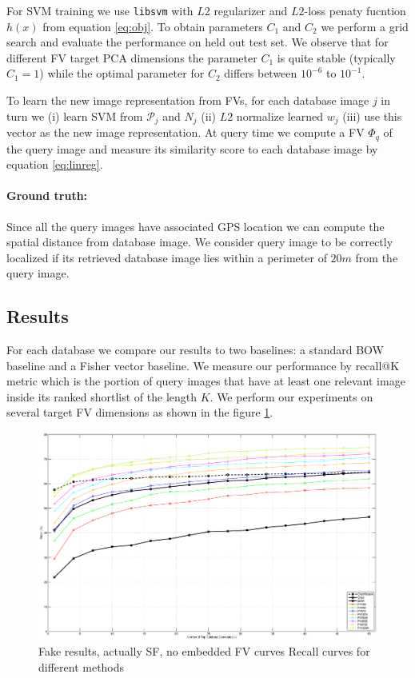 \documentclass[table]{article} %
\begin{document}
			For SVM training we use {\tt libsvm} \cite{libsvm} with $L2$ regularizer and $L2$-loss penaty fucntion $h(x)$ from equation \eqref{eq:obj}. To obtain parameters $C_1$ and $C_2$ we perform a grid search and evaluate the performance on held out test set. We observe that for different FV target PCA dimensions the parameter $C_1$ is quite stable (typically $C_1=1$) while the optimal parameter for $C_2$ differs between $10^{-6}$ to $10^{-1}$.

			To learn the new image representation from FVs, for each database image $j$ in turn we (i) learn SVM from $\mathcal P_j$ and $N_j$ (ii) $L2$ normalize learned $w_j$ (iii) use this vector as the new image representation. At query time we compute a FV $\Phi_q$ of the query image and measure its similarity score to each database image by equation \eqref{eq:linreg}.
		
		\vspace{-4mm}
		\paragraph{Ground truth:}
			Since all the query images have associated GPS location we can compute the spatial distance from database image. We consider query image to be correctly localized if its retrieved database image lies within a perimeter of $20m$ from the query image.
	
	\subsection{Results}
		For each database we compare our results to two baselines: a standard BOW baseline and a Fisher vector baseline. We measure our performance by recall@K metric which is the portion of query images that have at least one relevant image inside its ranked shortlist of the length $K$. We perform our experiments on several target FV dimensions as shown in the figure \ref{fig:recall}.

		\begin{figure}
		\centering
		\includegraphics[width=\linewidth]{evaluationWOWplot}	
		\caption{
			\textcolor{myRed}{Fake results, actually SF, no embedded FV curves}
			Recall curves for different methods
		}
		\label{fig:recall}
		\end{figure}
\end{document}
